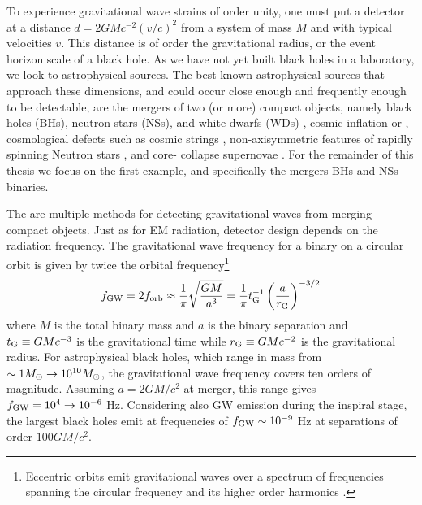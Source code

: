 To experience gravitational wave strains of order unity, one must put a
detector at a distance $d= 2GMc^{-2} (v/c)^2$ from a system of mass $M$ and
with typical velocities $v$. This distance is of order the gravitational
radius, or the event horizon scale of a black hole. As we have not yet built
black holes in a laboratory, we look to astrophysical sources. The best known
astrophysical sources that approach these dimensions, and could occur
close enough and frequently enough to be detectable, are the mergers of two
(or more) compact objects, namely black holes (BHs), neutron stars (NSs), and
white dwarfs (WDs) \citep[\emph{e.g.}][]{ThorneBraginsky:1976,
ClarkeErdley:1977, Belczynski:2016}, cosmic inflation \citep{Starobinski:1979}
or \citep[\emph{e.g.}][for a recent review]{Guzzetti:2016}, cosmological
defects such as cosmic strings \citep[\emph{e.g.}][and references
therein]{Damour:2005},  non-axisymmetric features of rapidly spinning Neutron
stars \citep[\emph{e.g.}][and references therein]{Haskell:2015}, and core-
collapse supernovae \citep[\emph{e.g.}][and references therein]{FryerNew:2003:LRR}.  For the remainder of this thesis we focus on the
first example, and specifically  the mergers BHs and NSs binaries.

The are multiple methods for detecting gravitational waves from merging
compact objects. Just as for EM radiation, detector design depends on the
radiation frequency. The gravitational wave frequency for a binary on a
circular orbit is given by twice the orbital frequency\footnote{Eccentric
orbits emit gravitational waves over a spectrum of frequencies spanning the
circular frequency and its higher order harmonics \citep[\emph{e.g.}][]{Enoki:2007}.} 
\begin{equation}
f_{\rm{GW}} = 2 f_{\rm{orb}} \approx  \frac{1}{\pi} \sqrt{\frac{G M }{a^3}} =
\frac{1}{\pi} t^{-1}_{\rm{G}} \left( \frac{a}{r_{\rm{G}}} \right)^{-3/2}
\label{Eq:GWfreq}
\end{equation} 
where $M$ is the total binary mass and $a$ is the binary
separation and $t_{\rm{G}} \equiv GMc^{-3}$ is the gravitational time while
$r_{\rm{G}} \equiv GMc^{-2}$ is the gravitational radius.  For astrophysical
black holes, which range in mass from $\sim 1 {M_{\odot}} \rightarrow 10^{10}
{M_{\odot}}$, the gravitational wave frequency covers ten orders of magnitude.
Assuming $a = 2GM/c^2$ at merger, this range gives $f_{\rm{GW}} = 10^4 \rightarrow
10^{-6}$ Hz. Considering also GW emission during the inspiral stage, the
largest black holes emit at frequencies of $f_{\rm{GW}} \sim 10^{-9}$ Hz at
separations of order $100 GM/c^2$.

